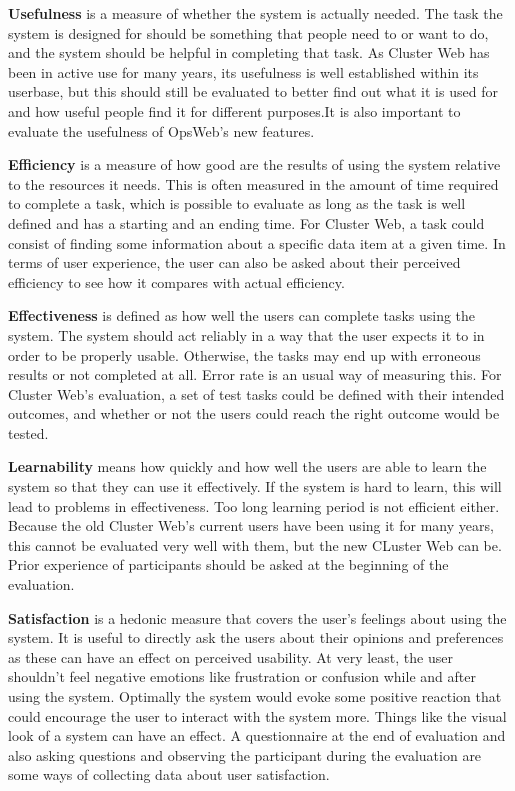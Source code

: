 \textbf{Usefulness} is a measure of whether the system is actually needed. The task the system is designed for should be something that people need to or want to do, and the system should be helpful in completing that task. As Cluster Web has been in active use for many years, its usefulness is well established within its userbase, but this should still be evaluated to better find out what it is used for and how useful people find it for different purposes.It is also important to evaluate the usefulness of OpsWeb's new features.

\textbf{Efficiency} is a measure of how good are the results of using the system relative to the resources it needs. This is often measured in the amount of time required to complete a task, which is possible to evaluate as long as the task is well defined and has a starting and an ending time. For Cluster Web, a task could  consist of finding some information about a specific data item at a given time. In terms of user experience, the user can also be asked about their perceived efficiency to see how it compares with actual efficiency.

\textbf{Effectiveness} is defined as how well the users can complete tasks using the system. The system should act reliably in a way that the user expects it to in order to be properly usable. Otherwise, the tasks may end up with erroneous results or not completed at all. Error rate is an usual way of measuring this. For Cluster Web's evaluation, a set of test tasks could be defined with their intended outcomes, and whether or not the users could reach the right outcome would be tested.

\textbf{Learnability} means how quickly and how well the users are able to learn the system so that they can use it effectively. If the system is hard to learn, this will lead to problems in effectiveness. Too long learning period is not efficient either. Because the old Cluster Web's current users have been using it for many years, this cannot be evaluated very well with them, but the new CLuster Web can be. Prior experience of participants should be asked at the beginning of the evaluation.

\textbf{Satisfaction} is a hedonic measure that covers the user's feelings about using the system. It is useful to directly ask the users about their opinions and preferences as these can have an effect on perceived usability. At very least, the user shouldn't feel negative emotions like frustration or confusion while and after using the system. Optimally the system would evoke some positive reaction that could encourage the user to interact with the system more. Things like the visual look of a system can have an effect. A questionnaire at the end of evaluation and also asking questions and observing the participant during the evaluation are some ways of collecting data about user satisfaction.

